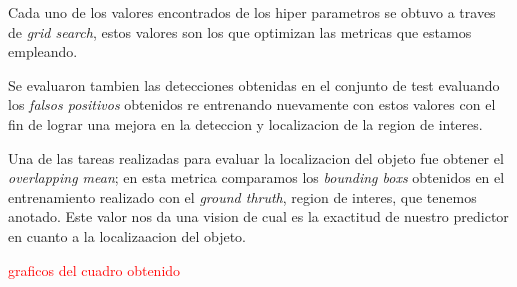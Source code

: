 Cada uno de los valores encontrados de los hiper parametros se obtuvo a traves de \textit{grid search}, estos valores son los que optimizan las metricas que estamos empleando.

Se evaluaron tambien las detecciones obtenidas en el conjunto de test evaluando los \textit{falsos positivos} obtenidos re entrenando nuevamente con estos valores con el fin de lograr una mejora en la deteccion y localizacion de la region de interes.

Una de las tareas realizadas para evaluar la localizacion del objeto fue obtener el \textit{overlapping mean}; en esta metrica comparamos los \textit{bounding boxs} obtenidos en el entrenamiento realizado con el \textit{ground thruth}, region de interes, que tenemos anotado. Este valor nos da una vision de cual es la exactitud de nuestro predictor en cuanto a la localizaacion del objeto.

\textcolor{red}{graficos del cuadro obtenido}







